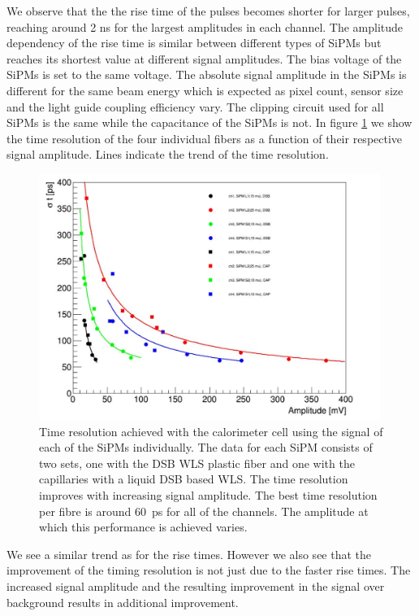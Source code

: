 %
We observe that the the rise time of the pulses becomes shorter for larger pulses, 
reaching around 2 ns for the largest amplitudes in each channel. 
The amplitude dependency of the rise time is similar between different types of SiPMs but 
reaches its shortest value at different signal amplitudes. 
The bias voltage of the SiPMs is set to the same voltage. The absolute signal amplitude in the SiPMs is 
different for the same beam energy which is expected as pixel count, sensor size and the light guide coupling 
efficiency vary. The clipping circuit used for all SiPMs is the same while the capacitance 
of the  SiPMs is not. In figure \ref{TimeResolution} we show the time resolution of the four individual 
fibers as a function of their respective signal amplitude. Lines indicate the trend of the time resolution.
%
\begin{figure}[htb]
\includegraphics[width=0.99\textwidth]{SH_timing_SiPM.pdf}
\caption{\label{TimeResolution} Time resolution achieved with the calorimeter cell using the signal of each 
of the  SiPMs individually. The data for each SiPM consists of two sets, one with the DSB WLS plastic fiber and one with 
the capillaries with a liquid DSB based WLS. The time resolution improves with increasing signal amplitude. The best time 
resolution per fibre is around $60$~ps for all of the channels. The amplitude at which this performance is achieved varies.}
\end{figure}
%
We see a similar trend as for the rise times. However we also see that the improvement of the timing resolution is 
not just due to the faster rise times. The increased signal amplitude and the resulting improvement in the signal over 
background results in additional improvement.


